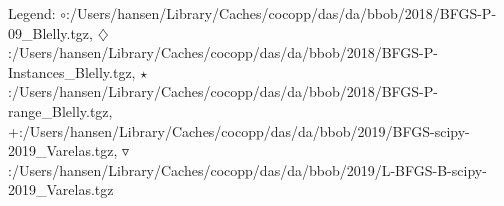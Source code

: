 Legend: {\color{CornflowerBlue}$\circ$}:/Users/hansen/Library/Caches/cocopp/das/da/bbob/2018/BFGS-P-09\_Blelly.tgz, {{}$\diamondsuit$}:/Users/hansen/Library/Caches/cocopp/das/da/bbob/2018/BFGS-P-Instances\_Blelly.tgz, {\color{Green}$\star$}:/Users/hansen/Library/Caches/cocopp/das/da/bbob/2018/BFGS-P-range\_Blelly.tgz, {\color{red}+}:/Users/hansen/Library/Caches/cocopp/das/da/bbob/2019/BFGS-scipy-2019\_Varelas.tgz, {\color{brown}$\triangledown$}:/Users/hansen/Library/Caches/cocopp/das/da/bbob/2019/L-BFGS-B-scipy-2019\_Varelas.tgz